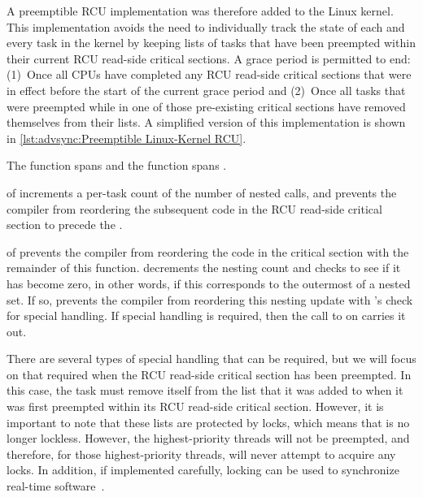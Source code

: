 A preemptible RCU implementation was therefore added to the Linux kernel.
This implementation avoids the need to individually track the state of
each and every task in the kernel by keeping lists of tasks that have
been preempted within their current RCU read-side critical sections.
A grace period is permitted to end: (1)~Once all CPUs have completed any
RCU read-side critical sections that were in effect before the start
of the current grace period and
(2)~Once all tasks that were preempted
while in one of those pre-existing critical sections have removed
themselves from their lists.
A simplified version of this implementation is shown in
\cref{lst:advsync:Preemptible Linux-Kernel RCU}.
\begin{fcvref}
The  function spans  and
the  function spans .
\end{fcvref}

\begin{fcvref}
 of  increments a per-task count of the
number of nested  calls, and
 prevents the compiler from reordering the subsequent code in the
RCU read-side critical section to precede the .
\end{fcvref}

\begin{fcvref}
 of  prevents the compiler from
reordering the code in the critical section with the remainder of
this function.
 decrements the nesting count and checks to see if it
has become zero, in other words, if this corresponds to the outermost
 of a nested set.
If so,  prevents the compiler from reordering this nesting
update with 's check for special handling.
If special handling is required, then the call to
 on  carries it out.

There are several types of special handling that can be required, but
we will focus on that required when the RCU read-side critical section
has been preempted.
In this case, the task must remove itself from the list that it was
added to when it was first preempted within its
RCU read-side critical section.
However, it is important to note that these lists are protected by locks,
which means that  is no longer lockless.
However, the highest-priority threads will not be preempted, and therefore,
for those highest-priority threads,  will never
attempt to acquire any locks.
In addition, if implemented carefully, locking can be used to synchronize
real-time software~\cite{BjoernBrandenburgPhD,DipankarSarma2004OLSscalability}.
\end{fcvref}

